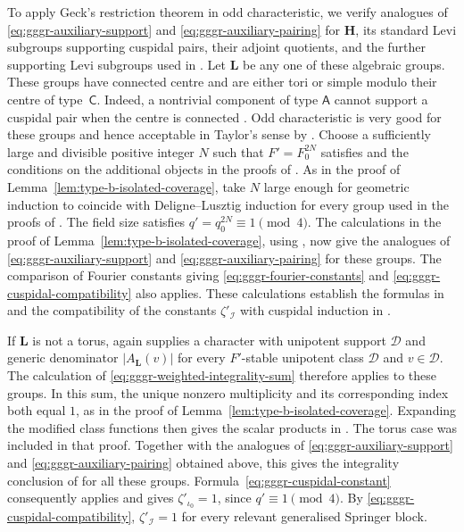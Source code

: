 \documentclass[10pt]{amsart}
\theoremstyle{definition}
\let\oldendproof\endproof
\renewenvironment{proof}[1][\proofname]{%
  \oldproof[\bfseries #1]%
}{\oldendproof}
\numberwithin{equation}{section}
\numberwithin{table}{section}
\begin{document}
\begin{proof}[Proof of Lemma~\ref{lem:symplectic-gggr-selection}]
To apply Geck's restriction theorem \cite[Theorem~4.5]{Geck1999GGGR}
in odd characteristic, we verify analogues of \eqref{eq:gggr-auxiliary-support}
and \eqref{eq:gggr-auxiliary-pairing} for $\mathbf H$, its standard Levi subgroups
supporting cuspidal pairs, their adjoint quotients, and the further supporting
Levi subgroups used in \cite[(4.9)]{Geck1999GGGR}.
Let $\mathbf L$ be any one of these algebraic groups.
These groups have connected centre and are either tori or simple modulo
their centre of type~$\mathsf C$. Indeed, a nontrivial component of type
$\mathsf A$ cannot support a cuspidal pair when the centre is connected
\cite[Remark~3.4 and the proof of Theorem~3.8]{Geck1999GGGR}.
Odd characteristic is very good for these groups and hence acceptable in
Taylor's sense by \cite[Lemma~6.3(i)]{Taylor2016}.
Choose a sufficiently large and divisible positive integer $N$ such that
$F'=F_0^{2N}$ satisfies \cite[(4.7)(a)--(c)]{Geck1999GGGR} and the
conditions on the additional objects in the proofs of
\cite[Propositions~5.3 and 5.5]{Geck1999GGGR}.
As in the proof of Lemma~\ref{lem:type-b-isolated-coverage}, take $N$ large
enough for geometric induction to coincide with Deligne--Lusztig induction
\cite[p.~115]{Letellier2005} for every group used in the proofs of
\cite[Propositions~5.3 and~5.5]{Geck1999GGGR}.
The field size satisfies $q'=q_0^{2N}\equiv1\pmod4$.
The calculations in the proof of Lemma~\ref{lem:type-b-isolated-coverage},
using \cite[Theorem~11.13 and Lemma~11.16]{Taylor2016}, now give
the analogues of \eqref{eq:gggr-auxiliary-support} and
\eqref{eq:gggr-auxiliary-pairing} for these groups.
The comparison of Fourier constants giving
\eqref{eq:gggr-fourier-constants} and
\eqref{eq:gggr-cuspidal-compatibility} also applies.
These calculations establish the formulas in \cite[(2.4)]{Geck1999GGGR} and
the compatibility of the constants $\zeta'_{\mathcal I}$ with cuspidal
induction in \cite[(3.3)(b)]{Geck1999GGGR}.

If $\mathbf L$ is not a torus,
\cite[Theorem~1.1]{Taylor2013} again supplies a character with unipotent
support $\mathcal D$ and generic denominator $|A_{\mathbf L}(v)|$ for
every $F'$-stable unipotent class $\mathcal D$ and $v\in\mathcal D$.
The calculation of \eqref{eq:gggr-weighted-integrality-sum} therefore applies
to these groups. In this sum, the unique nonzero multiplicity and its
corresponding index both equal $1$, as in the proof of
Lemma~\ref{lem:type-b-isolated-coverage}. Expanding the modified class
functions then gives the scalar products in
\cite[Proposition~3.1]{Geck1999GGGR}.
The torus case was included in that proof. Together with the analogues of
\eqref{eq:gggr-auxiliary-support} and \eqref{eq:gggr-auxiliary-pairing}
obtained above, this gives the integrality conclusion of
\cite[Corollary~3.2]{Geck1999GGGR} for all these groups.
Formula~\eqref{eq:gggr-cuspidal-constant} consequently applies and gives
$\zeta'_{\iota_0}=1$, since $q'\equiv1\pmod4$.
By \eqref{eq:gggr-cuspidal-compatibility}, $\zeta'_{\mathcal I}=1$
for every relevant generalised Springer block.


\end{proof}
\end{document}
